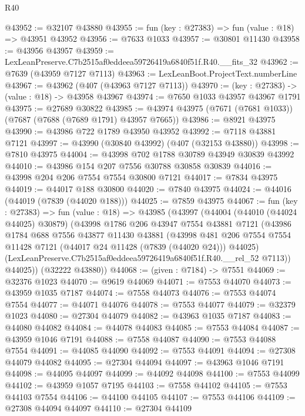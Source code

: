 \begin{lexlean}{R40}
\begin{coremodule}
@43952 := @32107 @43880
@43955 := fun (key : @27383) => fun (value : @18) => @43951 @43952
@43956 := @7633 @1033
@43957 := @30801 @11430
@43958 := @43956 @43957
@43959 := LexLeanPreserve.C7b2515af0eddeea59726419a6840f51f.R40.__fits_32
@43962 := @7639 (@43959 @7127 @7113)
@43963 := LexLeanBoot.ProjectText.numberLine
@43967 := @43962 (@407 (@43963 @7127 @7113))
@43970 := (key : @27383) -> (value : @18) -> @43958 @43967
@43974 := @7650 @1033 @43957 @43967 @1791
@43975 := @27689 @30822
@43985 := @43974 @43975 (@7671 (@7681 @1033)) (@7687 (@7688 (@7689 @1791) @43957 @7665))
@43986 := @8921 @43975
@43990 := @43986 @722 @1789 @43950 @43952
@43992 := @7118 @43881 @7121
@43997 := @43990 (@30840 @43992) (@407 (@32153 @43880))
@43998 := @7810 @43975
@44004 := @43998 @702 @1788 @30789 @43949 @30839 @43992
@44010 := @43986 @154 @207 @7556 @30788 @30858 @30839
@44016 := @43998 @204 @206 @7554 @7554 @30800 @7121
@44017 := @7834 @43975
@44019 := @44017 @188 @30800
@44020 := @7840 @43975
@44024 := @44016 (@44019 (@7839 (@44020 @188)))
@44025 := @7859 @43975
@44067 := fun (key : @27383) =>
  fun (value : @18) =>
  @43985
    (@43997
      (@44004
        (@44010 (@44024 @44025) @30879)
        (@43998
          @1786
          @206
          @43947
          @7554
          @43881
          @7121
          (@43986
            @1784
            @688
            @7556
            @43877
            @11430
            @43881
            (@43998
              @481
              @206
              @7554
              @7554
              @11428
              @7121
              (@44017 @24 @11428 (@7839 (@44020 @24)))
              @44025)
            (LexLeanPreserve.C7b2515af0eddeea59726419a6840f51f.R40.__rel_52 @7113))
          @44025))
      (@32222 @43880))
@44068 := (given : @7184) -> @7551
@44069 := @32376 @1023
@44070 := @9619 @44069
@44071 := @7553 @44070
@44073 := @43959 @1035 @7187
@44074 := @7558 @44073
@44076 := @7553 @44074 @7554
@44077 := @44071 @44076
@44078 := @7553 @44077
@44079 := @32379 @1023
@44080 := @27304 @44079
@44082 := @43963 @1035 @7187
@44083 := @44080 @44082
@44084 := @44078 @44083
@44085 := @7553 @44084
@44087 := @43959 @1046 @7191
@44088 := @7558 @44087
@44090 := @7553 @44088 @7554
@44091 := @44085 @44090
@44092 := @7553 @44091
@44094 := @27308 @44079 @44082
@44095 := @27304 @44094
@44097 := @43963 @1046 @7191
@44098 := @44095 @44097
@44099 := @44092 @44098
@44100 := @7553 @44099
@44102 := @43959 @1057 @7195
@44103 := @7558 @44102
@44105 := @7553 @44103 @7554
@44106 := @44100 @44105
@44107 := @7553 @44106
@44109 := @27308 @44094 @44097
@44110 := @27304 @44109

\end{coremodule}
\end{lexlean}
